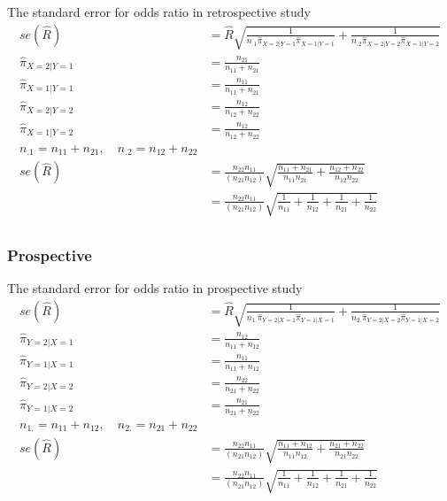 \documentclass[11pt]{article} %
\begin{document}
	The standard error for odds ratio in retrospective study\\
	\begin{align*}
		se(\hat R) &= \hat{R} \sqrt{\frac{1}{n_{.1}\hat{\pi}_{X=2|Y=1}\hat{\pi}_{X=1|Y=1} } + \frac{1}{n_{.2}\hat{\pi}_{X=2|Y=2} \hat {\pi}_{X=1|Y=2} } }\\
		\hat{\pi}_{X=2|Y=1} &= \frac{n_{21}}{n_{11}+ n_{21}}\\
		\hat{\pi}_{X=1|Y=1} &= \frac{n_{11}}{n_{11}+ n_{21}}\\
		\hat{\pi}_{X=2|Y=2} &=  \frac{n_{12}}{n_{12} + n_{22}}\\
		\hat {\pi}_{X=1|Y=2} &= \frac{n_{12}}{n_{12} + n_{22}}\\
		n_{.1} = n_{11}+ n_{21}, \quad n_{.2}=n_{12} + n_{22}\\
		se(\hat R) &= \frac{n_{22}n_{11}}{(n_{21}n_{12})} \sqrt{\frac{n_{11}+n_{21}}{n_{11}n_{21}} + \frac{n_{12}+n_{22}}{n_{12}n_{22}} }\\
		&= \frac{{n_{22}n_{11}}}{(n_{21}n_{12})} \sqrt{\frac{1}{n_{11}} + \frac{1}{n_{12}} + \frac{1}{n_{21}} + \frac{1}{n_{22}}}\\
	\end{align*}
\subsubsection{Prospective}
The standard error for odds ratio in prospective study\\
	\begin{align*}
		se(\hat R) &= \hat{R} \sqrt{\frac{1}{n_{1.}\hat{\pi}_{Y=2|X=1}\hat{\pi}_{Y=1|X=1} } + \frac{1}{n_{2.}\hat{\pi}_{Y=2|X=2} \hat {\pi}_{Y=1|X=2} } }\\
		\hat{\pi}_{Y=2|X=1} &= \frac{n_{12}}{n_{11}+ n_{12}}\\
		\hat{\pi}_{Y=1|X=1} &= \frac{n_{11}}{n_{11}+ n_{12}}\\
		\hat{\pi}_{Y=2|X=2} &=  \frac{n_{22}}{n_{21} + n_{22}}\\
		\hat {\pi}_{Y=1|X=2} &= \frac{n_{21}}{n_{21} + n_{22}}\\
		n_{1.} = n_{11}+ n_{12}, \quad n_{2.}=n_{21} + n_{22}\\
		se(\hat R) &= \frac{n_{22}n_{11}}{(n_{21}n_{12})} \sqrt{\frac{n_{11}+n_{12}}{n_{11}n_{12}} + \frac{n_{21}+n_{22}}{n_{21}n_{22}} }\\
		&= \frac{{n_{22}n_{11}}}{(n_{21}n_{12})} \sqrt{\frac{1}{n_{11}} + \frac{1}{n_{12}} + \frac{1}{n_{21}} + \frac{1}{n_{22}}}\\
	\end{align*}
	
\end{document}
